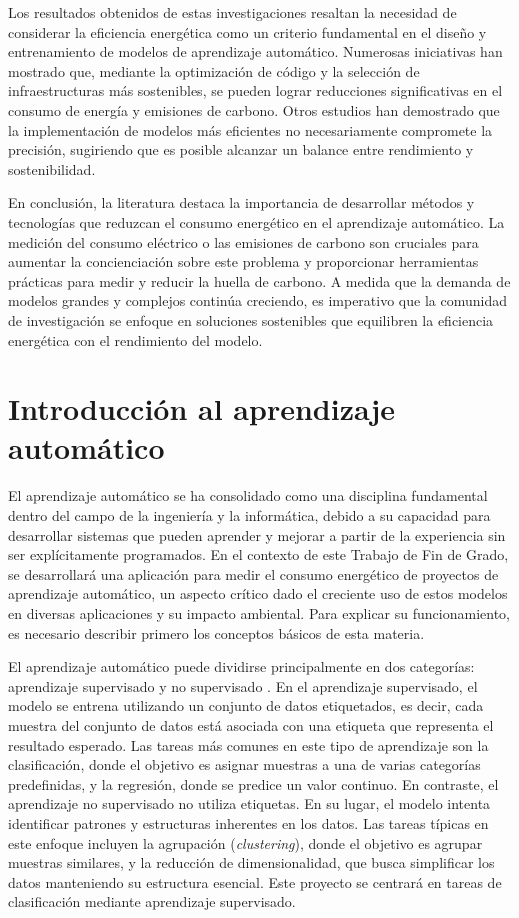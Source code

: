 Los resultados obtenidos de estas investigaciones resaltan la necesidad de considerar la eficiencia energética como un criterio fundamental en el diseño y entrenamiento de modelos de aprendizaje automático. Numerosas iniciativas han mostrado que, mediante la optimización de código y la selección de infraestructuras más sostenibles, se pueden lograr reducciones significativas en el consumo de energía y emisiones de carbono. Otros estudios han demostrado que la implementación de modelos más eficientes no necesariamente compromete la precisión, sugiriendo que es posible alcanzar un balance entre rendimiento y sostenibilidad.

En conclusión, la literatura destaca la importancia de desarrollar métodos y tecnologías que reduzcan el consumo energético en el aprendizaje automático. La medición del consumo eléctrico o las emisiones de carbono son cruciales para aumentar la concienciación sobre este problema y proporcionar herramientas prácticas para medir y reducir la huella de carbono. A medida que la demanda de modelos grandes y complejos continúa creciendo, es imperativo que la comunidad de investigación se enfoque en soluciones sostenibles que equilibren la eficiencia energética con el rendimiento del modelo.

\section{Introducción al aprendizaje automático}
\label{sec:intro-ml}

El aprendizaje automático se ha consolidado como una disciplina fundamental dentro del campo de la ingeniería y la informática, debido a su capacidad para desarrollar sistemas que pueden aprender y mejorar a partir de la experiencia sin ser explícitamente programados. En el contexto de este Trabajo de Fin de Grado, se desarrollará una aplicación para medir el consumo energético de proyectos de aprendizaje automático, un aspecto crítico dado el creciente uso de estos modelos en diversas aplicaciones y su impacto ambiental. Para explicar su funcionamiento, es necesario describir primero los conceptos básicos de esta materia.

El aprendizaje automático puede dividirse principalmente en dos categorías: aprendizaje supervisado y no supervisado \cite{kelleher2020fundamentals}. En el aprendizaje supervisado, el modelo se entrena utilizando un conjunto de datos etiquetados, es decir, cada muestra del conjunto de datos está asociada con una etiqueta que representa el resultado esperado. Las tareas más comunes en este tipo de aprendizaje son la clasificación, donde el objetivo es asignar muestras a una de varias categorías predefinidas, y la regresión, donde se predice un valor continuo. 
En contraste, el aprendizaje no supervisado no utiliza etiquetas. En su lugar, el modelo intenta identificar patrones y estructuras inherentes en los datos. Las tareas típicas en este enfoque incluyen la agrupación (\textit{clustering}), donde el objetivo es agrupar muestras similares, y la reducción de dimensionalidad, que busca simplificar los datos manteniendo su estructura esencial. Este proyecto se centrará en tareas de clasificación mediante aprendizaje supervisado.

